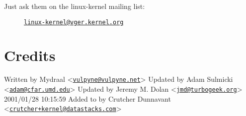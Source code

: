 \documentclass[article,letterpaper]{memoir}
\let\subsection\section
\let\section\chapter
\begin{document}
\begin{description}
\item[Just ask them on the linux-kernel mailing list:]
\href{mailto:linux-kernel@vger.kernel.org}{\nolinkurl{linux-kernel@vger.kernel.org}}
\end{description}
\fi

\subsection{Credits}\label{credits}

Written by Mydraal
\textless{}\href{mailto:vulpyne@vulpyne.net}{\nolinkurl{vulpyne@vulpyne.net}}\textgreater{}
Updated by Adam Sulmicki
\textless{}\href{mailto:adam@cfar.umd.edu}{\nolinkurl{adam@cfar.umd.edu}}\textgreater{}
Updated by Jeremy M. Dolan
\textless{}\href{mailto:jmd@turbogeek.org}{\nolinkurl{jmd@turbogeek.org}}\textgreater{}
2001/01/28 10:15:59 Added to by Crutcher Dunnavant
\textless{}\href{mailto:crutcher+kernel@datastacks.com}{\nolinkurl{crutcher+kernel@datastacks.com}}\textgreater{}
\end{document}
